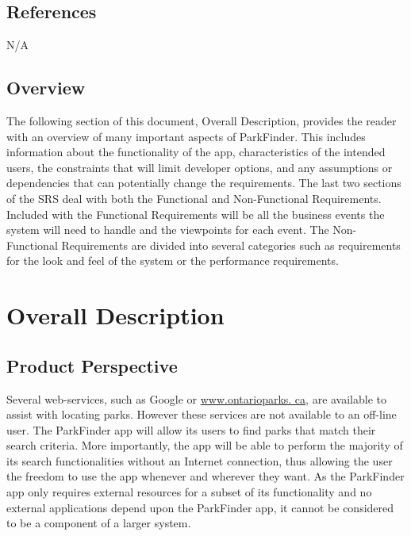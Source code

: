 \documentclass[titlepage]{article}
\begin{document}

\subsection{References}
\label{sub:references}
N/A

\subsection{Overview}
\label{sub:overview}
The following section of this document, Overall Description, provides the reader with an overview of
many important aspects of ParkFinder. This includes information about the functionality of the app,
characteristics of the intended users, the constraints that will limit developer options, and any
assumptions or dependencies that can potentially change the requirements. The last two sections of
the SRS deal with both the Functional and Non-Functional Requirements. Included with the Functional
Requirements will be all the business events the system will need to handle and the viewpoints for
each event. The Non-Functional Requirements are divided into several categories such as requirements
for the look and feel of the system or the performance requirements.


\section{Overall Description}
\label{sec:overall_description}

\subsection{Product Perspective}
\label{sub:product_perspective}
Several web-services, such as Google or \url{www.ontarioparks. 	ca}, are available to assist with
locating parks. However these services are not available to an off-line user. The ParkFinder app
will allow its users to find parks that match their search criteria. More importantly, the app
will be able to perform the majority of its search functionalities without an Internet connection,
thus allowing the user the freedom to use the app whenever and wherever they want. As the ParkFinder
app only requires external resources for a subset of its functionality and no external applications
depend upon the ParkFinder app, it cannot be considered to be a component of a larger system.
\end{document}
